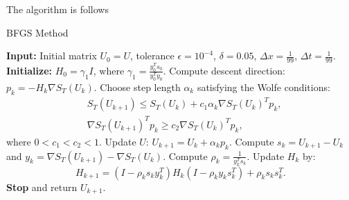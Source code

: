 \documentclass{article}
\begin{document}
The algorithm is follows
\begin{algorithm}
  \caption{BFGS Method}
  \begin{algorithmic}[1]
  \State \textbf{Input:} Initial matrix $U_0 = U$, tolerance $\epsilon = 10^{-4}$, $\delta = 0.05$, $\Delta x = \frac{1}{99}$, $\Delta t = \frac{1}{99}$.
  \State \textbf{Initialize:} $H_0 = \gamma_1 I$, where $\gamma_1 = \frac{y_0^T s_0}{y_0^T y_0}$.
      \State Compute descent direction: $p_k = -H_k \nabla S_T(U_k)$.
      \State Choose step length $\alpha_k$ satisfying the Wolfe conditions:
      \begin{align*}
      &S_T(U_{k+1}) \leq S_T(U_k) + c_1 \alpha_k \nabla S_T(U_k)^T p_k, \\
      &\nabla S_T(U_{k+1})^T p_k \geq c_2 \nabla S_T(U_k)^T p_k,
      \end{align*}
      where $0 < c_1 < c_2 < 1$.
      \State Update $U$: $U_{k+1} = U_k + \alpha_k p_k$.
      \State Compute $s_k = U_{k+1} - U_k$ and $y_k = \nabla S_T(U_{k+1}) - \nabla S_T(U_k)$.
      \State Compute $\rho_k = \frac{1}{y_k^T s_k}$.
      \State Update $H_k$ by:
      \[
      H_{k+1} = (I - \rho_k s_k y_k^T)H_k(I - \rho_k y_k s_k^T) + \rho_k s_k s_k^T.
      \]
          \State \textbf{Stop} and return $U_{k+1}$.
      \EndIf
  \EndFor
\end{algorithmic}
\end{algorithm}
\end{document}
